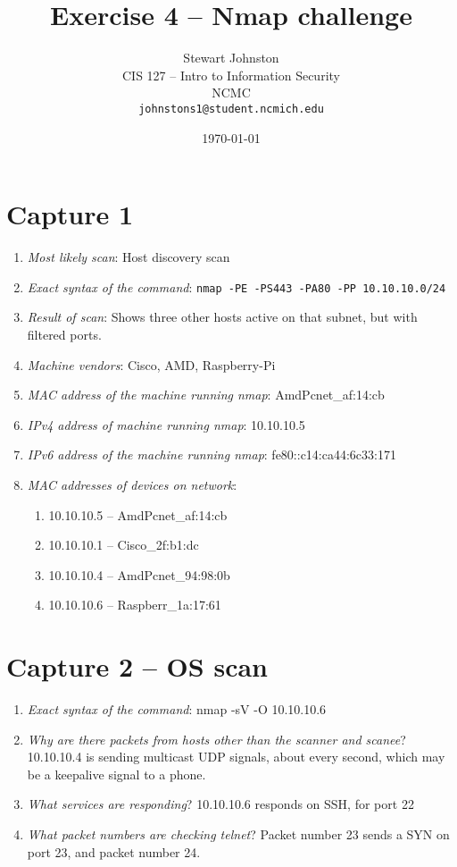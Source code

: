 \documentclass{article}
\title{Exercise 4 -- Nmap challenge}
\author{Stewart Johnston\\
  {CIS 127 -- Intro to Information Security}\\
  {NCMC}\\
  {\texttt{johnstons1@student.ncmich.edu}}
}
\date{\today}
\begin{document}
\maketitle

\section{Capture 1}
\begin{enumerate}
	\item {\em Most likely scan}: Host discovery scan
	\item {\em Exact syntax of the command}: \verb|nmap -PE -PS443 -PA80 -PP 10.10.10.0/24|
	\item {\em Result of scan}: Shows three other hosts active on that
			subnet, but with filtered ports.
		\item {\em Machine vendors}: Cisco, AMD, Raspberry-Pi
		\item {\em MAC address of the machine running nmap}: AmdPcnet\_af:14:cb
		\item {\em IPv4 address of machine running nmap}: 10.10.10.5
		\item {\em IPv6 address of the machine running nmap}: fe80::c14:ca44:6c33:171
		\item {\em MAC addresses of devices on network}:
		\begin{enumerate}
			\item 10.10.10.5 -- AmdPcnet\_af:14:cb
			\item 10.10.10.1 -- Cisco\_2f:b1:dc
			\item 10.10.10.4 -- AmdPcnet\_94:98:0b
			\item 10.10.10.6 -- Raspberr\_1a:17:61
		\end{enumerate}
\end{enumerate}

\section{Capture 2 -- OS scan}
\begin{enumerate}
	\item {\em Exact syntax of the command}: nmap -sV -O 10.10.10.6
	\item {\em Why are there packets from hosts other than the scanner and
		scanee}? 10.10.10.4 is sending multicast UDP signals, about
		every second, which may be a keepalive signal to a phone.
	\item {\em What services are responding}? 10.10.10.6 responds on SSH, for port 22
	\item {\em What packet numbers are checking telnet}? Packet number 23 sends a SYN on port 23, and packet number 24.
\end{enumerate}
\end{document}
